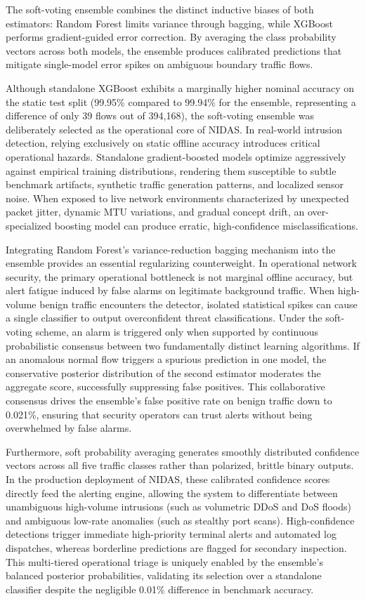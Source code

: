 \documentclass[12pt,a4paper]{report}
\begin{document}
The soft-voting ensemble combines the distinct inductive biases of both estimators: Random Forest limits variance through bagging, while XGBoost performs gradient-guided error correction. By averaging the class probability vectors across both models, the ensemble produces calibrated predictions that mitigate single-model error spikes on ambiguous boundary traffic flows.

Although standalone XGBoost exhibits a marginally higher nominal accuracy on the static test split (99.95\% compared to 99.94\% for the ensemble, representing a difference of only 39 flows out of 394,168), the soft-voting ensemble was deliberately selected as the operational core of NIDAS. In real-world intrusion detection, relying exclusively on static offline accuracy introduces critical operational hazards. Standalone gradient-boosted models optimize aggressively against empirical training distributions, rendering them susceptible to subtle benchmark artifacts, synthetic traffic generation patterns, and localized sensor noise. When exposed to live network environments characterized by unexpected packet jitter, dynamic MTU variations, and gradual concept drift, an over-specialized boosting model can produce erratic, high-confidence misclassifications.

Integrating Random Forest's variance-reduction bagging mechanism into the ensemble provides an essential regularizing counterweight. In operational network security, the primary operational bottleneck is not marginal offline accuracy, but alert fatigue induced by false alarms on legitimate background traffic. When high-volume benign traffic encounters the detector, isolated statistical spikes can cause a single classifier to output overconfident threat classifications. Under the soft-voting scheme, an alarm is triggered only when supported by continuous probabilistic consensus between two fundamentally distinct learning algorithms. If an anomalous normal flow triggers a spurious prediction in one model, the conservative posterior distribution of the second estimator moderates the aggregate score, successfully suppressing false positives. This collaborative consensus drives the ensemble's false positive rate on benign traffic down to 0.021\%, ensuring that security operators can trust alerts without being overwhelmed by false alarms.

Furthermore, soft probability averaging generates smoothly distributed confidence vectors across all five traffic classes rather than polarized, brittle binary outputs. In the production deployment of NIDAS, these calibrated confidence scores directly feed the alerting engine, allowing the system to differentiate between unambiguous high-volume intrusions (such as volumetric DDoS and DoS floods) and ambiguous low-rate anomalies (such as stealthy port scans). High-confidence detections trigger immediate high-priority terminal alerts and automated log dispatches, whereas borderline predictions are flagged for secondary inspection. This multi-tiered operational triage is uniquely enabled by the ensemble's balanced posterior probabilities, validating its selection over a standalone classifier despite the negligible 0.01\% difference in benchmark accuracy.
\end{document}
